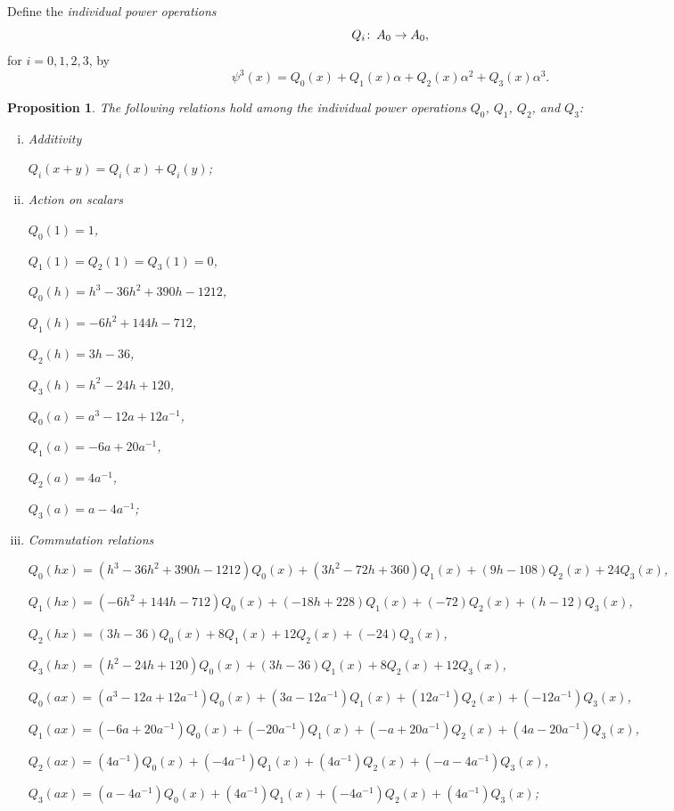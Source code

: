 \documentclass{gtpart}
\newtheorem{prop}[thm]{Proposition}
\theoremstyle{definition}
\theoremstyle{remark}
\def\co{\colon\thinspace}
\newcommand{\A}{\alpha}
\newcommand{\p}{\psi^3}
\begin{document}
Define the {\em individual power operations} 
\[
 Q_i \co A_0 \to A_0, 
\]
for $i = 0, 1, 2, 3$, by 
\[
 \p (x) = Q_0(x) + Q_1(x) \A + Q_2(x) \A^2 + Q_3(x) \A^3.  
\]

\begin{prop}
\label{prop:Gamma}
 The following relations hold among the individual power operations $Q_0$, $Q_1$, $Q_2$, and $Q_3$: 
 \begin{enumerate}[(i)]
  \item Additivity 

  $Q_i(x+y) = Q_i(x) + Q_i(y)$; 

  \item Action on scalars 
  
  $Q_0(1) = 1$, 

  $Q_1(1) = Q_2(1) = Q_3(1) = 0$, 

  $Q_0(h) = h^3 - 36 h^2 + 390 h - 1212$, 

  $Q_1(h) = -6 h^2 + 144 h - 712$, 

  $Q_2(h) = 3 h - 36$, 

  $Q_3(h) = h^2 - 24 h + 120$, 

  $Q_0(a) = a^3 - 12 a + 12 a^{-1}$, 

  $Q_1(a) = -6 a + 20 a^{-1}$, 

  $Q_2(a) = 4 a^{-1}$, 

  $Q_3(a) = a - 4 a^{-1}$; 

  \item Commutation relations 

  $Q_0(h x) = (h^3 - 36 h^2 + 390 h - 1212) Q_0(x) + (3 h^2 - 72 h + 360) Q_1(x) + (9 h - 108) Q_2(x) + 24 Q_3(x)$, 

  $Q_1(h x) = (-6 h^2 + 144 h - 712) Q_0(x) + (-18 h + 228) Q_1(x) + (-72) Q_2(x) + (h - 12) Q_3(x)$, 

  $Q_2(h x) = (3 h - 36) Q_0(x) + 8 Q_1(x) + 12 Q_2(x) + (-24) Q_3(x)$, 

  $Q_3(h x) = (h^2 - 24 h + 120) Q_0(x) + (3 h - 36) Q_1(x) + 8 Q_2(x) + 12 Q_3(x)$, 

  $Q_0(a x) = (a^3 - 12 a + 12 a^{-1}) Q_0(x) + (3 a - 12 a^{-1}) Q_1(x) + (12 a^{-1}) Q_2(x) + (-12 a^{-1}) Q_3(x)$, 

  $Q_1(a x) = (-6 a + 20 a^{-1}) Q_0(x) + (-20 a^{-1}) Q_1(x) + (- a + 20 a^{-1}) Q_2(x) + (4 a - 20 a^{-1}) Q_3(x)$, 

  $Q_2(a x) = (4 a^{-1}) Q_0(x) + (-4 a^{-1}) Q_1(x) + (4 a^{-1}) Q_2(x) + (- a - 4 a^{-1}) Q_3(x)$, 

  $Q_3(a x) = (a - 4 a^{-1}) Q_0(x) + (4 a^{-1}) Q_1(x) + (-4 a^{-1}) Q_2(x) + (4 a^{-1}) Q_3(x)$; 


\end{enumerate}
\end{prop}
\end{document}
